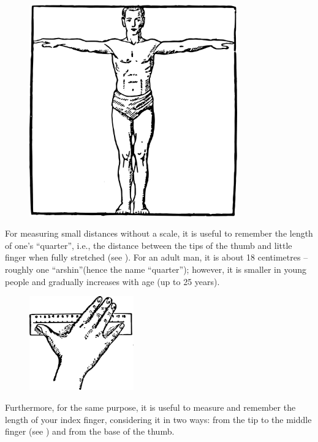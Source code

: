 \begin{figure}[h!]
\centering
\includegraphics[width=0.8\textwidth]{figures/ch-08/fig-117.pdf}
\end{figure}

For measuring small distances without a scale, it is useful to remember the length of one's ``quarter'', i.e., the distance between the tips of the thumb and little finger when fully stretched (see ). For an adult man, it is about 18 centimetres -- roughly one ``arshin''(hence the name ``quarter''); however, it is smaller in young people and gradually increases with age (up to 25 years).


\begin{figure}[h!]
\centering
\includegraphics[width=0.4\textwidth]{figures/ch-08/fig-118.pdf}
\end{figure}

Furthermore, for the same purpose, it is useful to measure and remember the length of your index finger, considering it in two ways: from the tip to the middle finger (see ) and from the base of the thumb.

